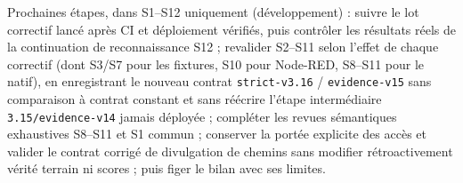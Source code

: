 \documentclass[11pt,a4paper]{article}
\newcommand{\code}[1]{{\urlstyle{tt}\nolinkurl{#1}}}
\begin{document}
Prochaines étapes, dans S1--S12 uniquement (développement) : suivre le lot correctif lancé après CI et déploiement vérifiés, puis contrôler les résultats réels de la continuation de reconnaissance S12 ; revalider S2--S11 selon l'effet de chaque correctif (dont S3/S7 pour les fixtures, S10 pour Node-RED, S8--S11 pour le natif), en enregistrant le nouveau contrat \code{strict-v3.16} / \code{evidence-v15} sans comparaison \`a contrat constant et sans r\'e\'ecrire l'\'etape interm\'ediaire \code{3.15/evidence-v14} jamais d\'eploy\'ee ; compl\'eter les revues s\'emantiques exhaustives S8--S11 et S1 commun ; conserver la port\'ee explicite des acc\`es et valider le contrat corrigé de divulgation de chemins sans modifier rétroactivement v\'erit\'e terrain ni scores ; puis figer le bilan avec ses limites.
\clearpage
{}
{}
\end{document}
